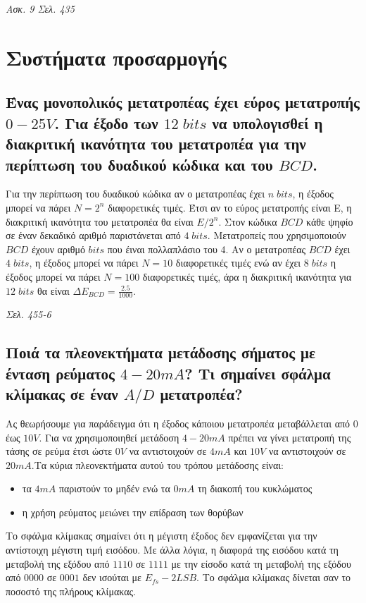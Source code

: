 \documentclass{article}
\begin{document}
\emph{Ασκ. 9 Σελ. 435}

\section{Συστήματα προσαρμογής}
\subsection{Ένας μονοπολικός μετατροπέας έχει εύρος μετατροπής $0-25V$. Για έξοδο των $12\; bits$ να υπολογισθεί η διακριτική ικανότητα του μετατροπέα για την περίπτωση 
του δυαδικού κώδικα και του $BCD$.}
Για την περίπτωση του δυαδικού κώδικα αν ο μετατροπέας έχει $n\; bits$, η έξοδος μπορεί να πάρει $N=2^n$ διαφορετικές τιμές. Έτσι αν το εύρος μετατροπής είναι Ε, η διακριτική
ικανότητα του μετατροπέα θα είναι $E/2^n$. Στον κώδικα $BCD$ κάθε ψηφίο σε έναν δεκαδικό αριθμό παριστάνεται από $4\; bits$. Μετατροπείς που χρησιμοποιούν $BCD$ 
έχουν αριθμό $bits$ που έιναι πολλαπλάσιο του 4. Αν ο μετατροπέας $BCD$ έχει $4\; bits$, η έξοδος μπορεί να πάρει $N=10$ διαφορετικές τιμές ενώ αν έχει $8\; bits$ η
έξοδος μπορεί να πάρει $N=100$ διαφορετικές τιμές, άρα η διακριτική ικανότητα για $12\; bits$ θα είναι $\Delta E_{BCD}=\frac{2.5}{1000}$.

\emph{Σελ. 455-6}

\subsection{Ποιά τα πλεονεκτήματα μετάδοσης σήματος με ένταση ρεύματος $4-20mA$? Τι σημαίνει σφάλμα κλίμακας σε έναν $A/D$ μετατροπέα?}
Ας θεωρήσουμε για παράδειγμα ότι η έξοδος κάποιου μετατροπέα μεταβάλλεται από $0$ έως $10V$. Για να χρησιμοποιηθεί μετάδοση $4-20 mA$ πρέπει να γίνει μετατροπή της 
τάσης σε ρεύμα έτσι ώστε $0V$ να αντιστοιχούν σε $4 mA$ και $10V$ να αντιστοιχούν σε $20 mA$.Τα κύρια πλεονεκτήματα αυτού του τρόπου μετάδοσης είναι:

\begin{itemize}
    \item τα $4mA$ παριστούν το μηδέν ενώ τα $0mA$ τη διακοπή του κυκλώματος
    \item η χρήση ρεύματος μειώνει την επίδραση των θορύβων
\end{itemize}

Το σφάλμα κλίμακας σημαίνει ότι η μέγιστη έξοδος δεν εμφανίζεται για την αντίστοιχη μέγιστη τιμή εισόδου. Με άλλα λόγια, η διαφορά της εισόδου κατά τη μεταβολή της 
εξόδου από $1110$ σε $1111$ με την είσοδο κατά τη μεταβολή της εξόδου από $0000$ σε $0001$ δεν ισούται με $E_{fs}-2LSB$. Το σφάλμα κλίμακας δίνεται σαν το ποσοστό 
της πλήρους κλίμακας.
\end{document}
